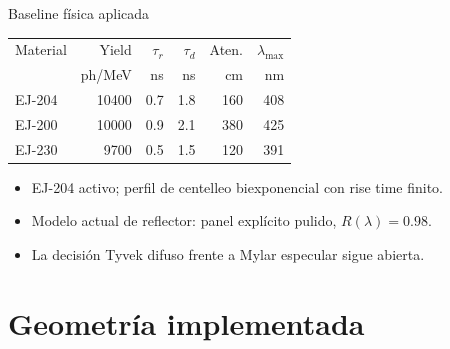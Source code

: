 \documentclass[aspectratio=169]{beamer}
\begin{document}
\begin{frame}{Baseline física aplicada}
  \centering
  \begin{tabular}{lrrrrr}
    \toprule
    Material & Yield & $\tau_r$ & $\tau_d$ & Aten. & $\lambda_{\max}$\\
             & ph/MeV & ns & ns & cm & nm\\
    \midrule
    EJ-204 & 10400 & 0.7 & 1.8 & 160 & 408\\
    EJ-200 & 10000 & 0.9 & 2.1 & 380 & 425\\
    EJ-230 & 9700  & 0.5 & 1.5 & 120 & 391\\
    \bottomrule
  \end{tabular}
  \vspace{0.5cm}
  \begin{itemize}
    \item EJ-204 activo; perfil de centelleo biexponencial con rise time finito.
    \item Modelo actual de reflector: panel explícito pulido, $R(\lambda)=0.98$.
    \item La decisión Tyvek difuso frente a Mylar especular sigue abierta.
  \end{itemize}
\end{frame}

\section{Geometría implementada}
\end{document}
